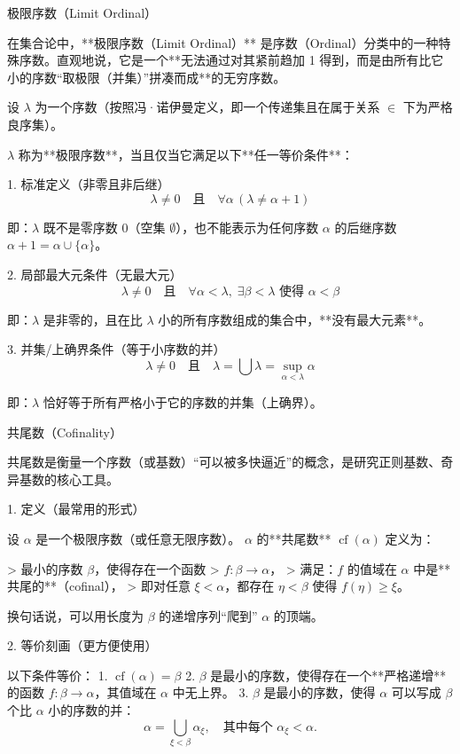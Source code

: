 \documentclass{beamer}
\begin{document}
\begin{frame}{极限序数（Limit Ordinal）}
\begin{markdown}
在集合论中，**极限序数（Limit Ordinal）** 是序数（Ordinal）分类中的一种特殊序数。直观地说，它是一个**无法通过对其紧前趋加 1 得到，而是由所有比它小的序数“取极限（并集）”拼凑而成**的无穷序数。

设 $\lambda$ 为一个序数（按照冯·诺伊曼定义，即一个传递集且在属于关系 $\in$ 下为严格良序集）。

$\lambda$ 称为**极限序数**，当且仅当它满足以下**任一等价条件**：

1. 标准定义（非零且非后继）
$$\lambda \neq 0 \quad \text{且} \quad \forall \alpha \, (\lambda \neq \alpha + 1)$$


即：$\lambda$ 既不是零序数 $0$（空集 $\emptyset$），也不能表示为任何序数 $\alpha$ 的后继序数 $\alpha + 1 = \alpha \cup \{\alpha\}$。

2. 局部最大元条件（无最大元）
$$\lambda \neq 0 \quad \text{且} \quad \forall \alpha < \lambda, \; \exists \beta < \lambda \text{ 使得 } \alpha < \beta$$


即：$\lambda$ 是非零的，且在比 $\lambda$ 小的所有序数组成的集合中，**没有最大元素**。

3. 并集/上确界条件（等于小序数的并）
$$\lambda \neq 0 \quad \text{且} \quad \lambda = \bigcup \lambda = \sup_{\alpha < \lambda} \alpha$$


即：$\lambda$ 恰好等于所有严格小于它的序数的并集（上确界）。
\end{markdown}
\end{frame}

\begin{frame}[fragile]{共尾数（Cofinality）}
\begin{markdown}
共尾数是衡量一个序数（或基数）“可以被多快逼近”的概念，是研究正则基数、奇异基数的核心工具。

1. 定义（最常用的形式）

设 $\alpha$ 是一个极限序数（或任意无限序数）。  
$\alpha$ 的**共尾数** $\operatorname{cf}(\alpha)$ 定义为：

> 最小的序数 $\beta$，使得存在一个函数  
> $f:\beta\to\alpha$，  
> 满足：$f$ 的值域在 $\alpha$ 中是**共尾的**（cofinal），  
> 即对任意 $\xi<\alpha$，都存在 $\eta<\beta$ 使得 $f(\eta)\ge\xi$。

换句话说，可以用长度为 $\beta$ 的递增序列“爬到” $\alpha$ 的顶端。

2. 等价刻画（更方便使用）

以下条件等价：
1. $\operatorname{cf}(\alpha)=\beta$
2. $\beta$ 是最小的序数，使得存在一个**严格递增**的函数 $f:\beta\to\alpha$，其值域在 $\alpha$ 中无上界。
3. $\beta$ 是最小的序数，使得 $\alpha$ 可以写成 $\beta$ 个比 $\alpha$ 小的序数的并：
   $$
   \alpha=\bigcup_{\xi<\beta}\alpha_\xi,\quad\text{其中每个 }\alpha_\xi<\alpha.
   $$
\end{markdown}
\end{frame}
\end{document}
